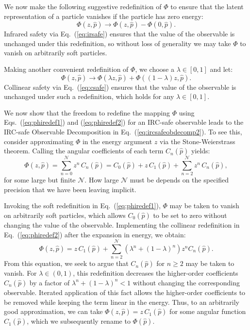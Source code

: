 \documentclass[letterpaper,11pt]{article}
\DeclareRobustCommand{\Eq}[1]{Eq.~(\ref{#1})}
\DeclareRobustCommand{\Eqs}[2]{Eqs.~(\ref{#1}) and (\ref{#2})}
\begin{document}
We now make the following suggestive redefinition of $\Phi$ to ensure that the latent representation of a particle vanishes if the particle has zero energy:
\begin{equation}
\label{eq:phiredef1}
\Phi(z,\hat p)\to\Phi(z,\hat p)-\Phi(0,\hat p).
\end{equation}
%
Infrared safety via \Eq{eq:irsafe} ensures that the value of the observable is unchanged under this redefinition, so without loss of generality we may take $\Phi$ to vanish on arbitrarily soft particles.


Making another convenient redefinition of $\Phi$, we choose a $\lambda\in[0,1]$ and let:
\begin{equation}
\label{eq:phiredef2}
\Phi(z,\hat p)\to\Phi(\lambda z,\hat p)+\Phi((1-\lambda)z,\hat p).
\end{equation}
%
Collinear safety via \Eq{eq:csafe} ensures that the value of the observable is unchanged under such a redefinition, which holds for any $\lambda\in[0,1]$.


We now show that the freedom to redefine the mapping $\Phi$ using \Eqs{eq:phiredef1}{eq:phiredef2} for an IRC-safe observable leads to the IRC-safe Observable Decomposition in \Eq{eq:ircsafeobdecomp2}.
%
To see this, consider approximating $\Phi$ in the energy argument $z$ via the Stone-Weierstrass theorem.
%
Calling the angular coefficients of each term $C_n(\hat p)$ yields:
\begin{equation}
\label{eq:phiexpand}
\Phi(z,\hat p)=\sum_{n=0}^{\mathcal N}z^n\,C_n(\hat p) = C_0(\hat p) + z\, C_1(\hat p)  + \sum_{n=2}^{\mathcal N} z^n\, C_n(\hat p),
\end{equation}
for some large but finite $\mathcal N$.
%
How large $\mathcal N$  must be depends on the specified precision that we have been leaving implicit.


Invoking the soft redefinition in \Eq{eq:phiredef1}, $\Phi$ may be taken to vanish on arbitrarily soft particles, which allows $C_0(\hat p)$ to be set to zero without changing the value of the observable.
%
Implementing the collinear redefinition in \Eq{eq:phiredef2} after the expansion in energy, we obtain:
\begin{equation}
\label{eq:expandwlambda}
\Phi(z,\hat p)=z\,C_1(\hat p)+\sum_{n=2}^{\mathcal N}(\lambda^n+(1-\lambda)^n)z^nC_n(\hat p).
\end{equation}
%
From this equation, we seek to argue that $C_n(\hat p)$ for $n\ge2$ may be taken to vanish.
%
For $\lambda\in (0,1)$, this redefinition decreases the higher-order coefficients $C_n(\hat p)$ by a factor of $\lambda^n+ (1-\lambda)^n<1$ without changing the corresponding observable.
%
Iterated application of this fact allows the higher-order coefficients to be removed while keeping the term linear in the energy.
%
Thus, to an arbitrarily good approximation, we can take $\Phi(z,\hat p)=z\,C_1(\hat p)$ for some angular function $C_1(\hat p)$, which we subsequently rename to $\Phi(\hat p)$.
\end{document}
